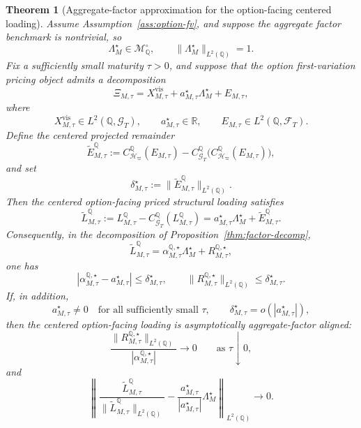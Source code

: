 \documentclass[11pt,a4paper]{amsart}
\theoremstyle{plain}
\newtheorem{theorem}{Theorem}[section]
\theoremstyle{definition}
\theoremstyle{remark}
\newcommand{\R}{\mathbb{R}}
\newcommand{\QQ}{\mathbb{Q}}
\newcommand{\cF}{\mathcal{F}}
\newcommand{\cG}{\mathcal{G}}
\newcommand{\cH}{\mathcal{H}}
\newcommand{\cM}{\mathcal{M}}
\begin{document}
\begin{theorem}[Aggregate-factor approximation for the option-facing centered loading]\label{thm:option-factor}
Assume Assumption~\ref{ass:option-fv}, and suppose the aggregate factor benchmark is nontrivial, so
\[
        \Lambda_M^\star\in \cM_\QQ^\circ,
        \qquad
        \|\Lambda_M^\star\|_{L^2(\QQ)}=1.
\]
Fix a sufficiently small maturity \(\tau>0\), and suppose
that the option first-variation pricing object admits a decomposition
\[
        \Xi_{M,\tau}
        =
        X_{M,\tau}^{\mathrm{vis}}
        +
        a_{M,\tau}^\star \Lambda_M^\star
        +
        E_{M,\tau},
\]
where
\[
        X_{M,\tau}^{\mathrm{vis}}\in L^2(\QQ,\cG_T),
        \qquad
        a_{M,\tau}^\star\in\R,
        \qquad
        E_{M,\tau}\in L^2(\QQ,\cF_T).
\]
Define the centered projected remainder
\[
        \widetilde E_{M,\tau}^\QQ
        :=
        C_{\cH_\varpi}^\QQ(E_{M,\tau})
        -
        C_{\cG_T}^\QQ\bigl(C_{\cH_\varpi}^\QQ(E_{M,\tau})\bigr),
\]
and set
\[
        \delta_{M,\tau}^\star:=\|\widetilde E_{M,\tau}^\QQ\|_{L^2(\QQ)}.
\]
Then the centered option-facing priced structural loading satisfies
\[
        \widetilde L_{M,\tau}^\QQ
        :=
        L_{M,\tau}^\QQ-C_{\cG_T}^\QQ(L_{M,\tau}^\QQ)
        =
        a_{M,\tau}^\star\Lambda_M^\star+\widetilde E_{M,\tau}^\QQ.
\]
Consequently, in the decomposition of Proposition~\ref{thm:factor-decomp},
\[
        \widetilde L_{M,\tau}^\QQ
        =
        \alpha_{M,\tau}^{\QQ,\star}\Lambda_M^\star
        +
        R_{M,\tau}^{\QQ,\star},
\]
one has
\[
        |\alpha_{M,\tau}^{\QQ,\star}-a_{M,\tau}^\star|
        \le
        \delta_{M,\tau}^\star,
        \qquad
        \|R_{M,\tau}^{\QQ,\star}\|_{L^2(\QQ)}
        \le
        \delta_{M,\tau}^\star.
\]
If, in addition,
\[
        a_{M,\tau}^\star\neq0
        \quad\text{for all sufficiently small }\tau,
        \qquad
        \delta_{M,\tau}^\star=o(|a_{M,\tau}^\star|),
\]
then the centered option-facing loading is asymptotically aggregate-factor aligned:
\[
        \frac{\|R_{M,\tau}^{\QQ,\star}\|_{L^2(\QQ)}}{|\alpha_{M,\tau}^{\QQ,\star}|}
        \to 0
        \qquad
        \text{as }\tau\downarrow0,
\]
and
\[
        \left\|
                \frac{\widetilde L_{M,\tau}^\QQ}{\|\widetilde L_{M,\tau}^\QQ\|_{L^2(\QQ)}}
                -
                \frac{a_{M,\tau}^\star}{|a_{M,\tau}^\star|}\Lambda_M^\star
        \right\|_{L^2(\QQ)}
        \to 0.
\]
\end{theorem}
\end{document}
